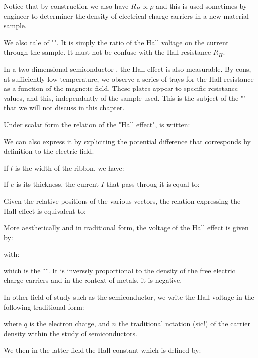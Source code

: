 	Notice that by construction we also have $R_H\propto \rho$ and this is used sometimes by engineer to determiner the density of electrical charge carriers in a new material sample.
	\begin{tcolorbox}[title=Remark,colframe=black,arc=10pt]
	We also tale of "". It is simply the ratio of the Hall voltage on the current through the sample. It must not be confuse with the Hall resistance $R_H$. 
	\end{tcolorbox}
	In a two-dimensional semiconductor , the Hall effect is also measurable. By cons, at sufficiently low temperature, we observe a series of trays for the Hall resistance as a function of the magnetic field. These plates appear to specific resistance values, and this, independently of the sample used. This is the subject of the "" that we will not discuss in this chapter.

	Under scalar form the relation of the "Hall effect", is written:
	
	We can also express it by expliciting the potential difference that corresponds by definition to the electric field.

	If $l$ is the width of the ribbon, we have:
	
	If $e$ is its thickness, the current $I$ that pass throug it is equal to:
	
	Given the relative positions of the various vectors, the relation expressing the Hall effect is equivalent to:
	
	More aesthetically and in traditional form, the voltage of the Hall effect is given by:
	
	with:
	
	which is the "". It is inversely proportional to the density of the free electric charge carriers and in the context of metals, it is negative.

	In other field of study such as the semiconductor, we write the Hall voltage in the following traditional form:
	
	where $q$ is the electron charge, and $n$ the traditional notation (sic!) of the carrier density within the study of semiconductors.

	We then in the latter field the Hall constant which is defined by:
	
